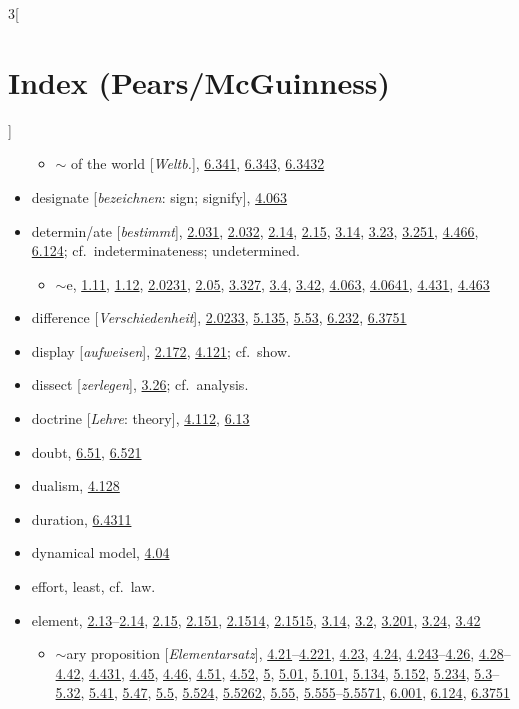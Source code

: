 \documentclass[oneside,openany,12pt]{book}
\newcommand{\indexentry}[1]{\item #1}
\newcommand{\indexsubentry}[1]{\begin{itemize} \item #1 \end{itemize}}
\newcommand{\indexref}[1]{\hyperlink{prop#1}{#1}}
\newcommand{\indexgap}{\bigskip}
\begin{document}
\begin{multicols}{3}[\section*{Index (Pears/McGuinness)}]
\begin{itemize}
   \indexsubentry{$\sim$ of the world [\textit{Weltb.}], \indexref{6.341}, \indexref{6.343}, \indexref{6.3432}}

\indexentry{designate [\textit{bezeichnen}: sign; signify], \indexref{4.063}}

\indexentry{determin/ate [\textit{bestimmt}], \indexref{2.031}, \indexref{2.032}, \indexref{2.14}, \indexref{2.15}, \indexref{3.14}, \indexref{3.23}, \indexref{3.251}, \indexref{4.466}, \indexref{6.124}; cf.\ indeterminateness; undetermined.}

   \indexsubentry{$\sim$e, \indexref{1.11}, \indexref{1.12}, \indexref{2.0231}, \indexref{2.05}, \indexref{3.327}, \indexref{3.4}, \indexref{3.42}, \indexref{4.063}, \indexref{4.0641}, \indexref{4.431}, \indexref{4.463}}

\indexentry{difference [\textit{Verschiedenheit}], \indexref{2.0233}, \indexref{5.135}, \indexref{5.53}, \indexref{6.232}, \indexref{6.3751}}

\indexentry{display [\textit{aufweisen}], \indexref{2.172}, \indexref{4.121}; cf.\ show.}

\indexentry{dissect [\textit{zerlegen}], \indexref{3.26}; cf.\ analysis.}

\indexentry{doctrine [\textit{Lehre}: theory], \indexref{4.112}, \indexref{6.13}}

\indexentry{doubt, \indexref{6.51}, \indexref{6.521}}

\indexentry{dualism, \indexref{4.128}}

\indexentry{duration, \indexref{6.4311}}

\indexentry{dynamical model, \indexref{4.04}}

\indexgap

\indexentry{effort, least, cf.\ law.}

\indexentry{element, \indexref{2.13}--\indexref{2.14}, \indexref{2.15}, \indexref{2.151}, \indexref{2.1514}, \indexref{2.1515}, \indexref{3.14}, \indexref{3.2}, \indexref{3.201}, \indexref{3.24}, \indexref{3.42}}

   \indexsubentry{$\sim$ary proposition [\textit{Elementarsatz}], \indexref{4.21}--\indexref{4.221}, \indexref{4.23}, \indexref{4.24}, \indexref{4.243}--\indexref{4.26}, \indexref{4.28}--\indexref{4.42}, \indexref{4.431}, \indexref{4.45}, \indexref{4.46}, \indexref{4.51}, \indexref{4.52}, \indexref{5}, \indexref{5.01}, \indexref{5.101}, \indexref{5.134}, \indexref{5.152}, \indexref{5.234}, \indexref{5.3}--\indexref{5.32}, \indexref{5.41}, \indexref{5.47}, \indexref{5.5}, \indexref{5.524}, \indexref{5.5262}, \indexref{5.55}, \indexref{5.555}--\indexref{5.5571}, \indexref{6.001}, \indexref{6.124}, \indexref{6.3751}}


\end{itemize}
\end{multicols}
\end{document}
